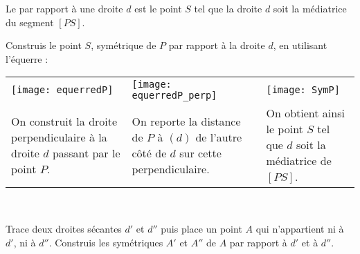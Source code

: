 

\begin{methode*1}

\begin{aconnaitre}
Le  par rapport à une droite $d$ est le point $S$ tel que la droite $d$ soit la médiatrice du segment $[PS]$. 
\end{aconnaitre}

\begin{exemple*1}
Construis le point $S$, symétrique de $P$ par rapport à la droite $d$, en utilisant l'équerre : \\[.5em]

\begin{tabularx}{\textwidth}{X|X|X}
 \texttt{[image: equerredP]} &  \texttt{[image: equerredP\_perp]} & \texttt{[image: SymP]} \\ 
 On construit la droite perpendiculaire à la droite $d$ passant par le point $P$. & On reporte la distance de $P$ à $(d)$ de l'autre côté de $d$ sur cette perpendiculaire. & On obtient ainsi le point $S$ tel que $d$ soit la médiatrice de $[PS]$. \\
\end{tabularx} \\

 \end{exemple*1}


\exercice
Trace deux droites sécantes $d'$ et $d''$ puis place un point $A$ qui n'appartient ni à $d'$, ni à $d''$. Construis les symétriques $A'$ et $A''$ de $A$ par rapport à $d'$ et à $d''$.
 
\end{methode*1}


